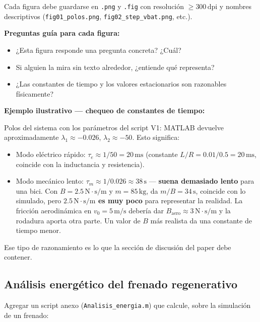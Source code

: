 \documentclass[11pt,a4paper]{article}
\newcommand{\unit}[1]{\,\mathrm{#1}}
\begin{document}
Cada figura debe guardarse en \texttt{.png} y \texttt{.fig} con resolución $\geq 300\unit{dpi}$ y nombres descriptivos (\texttt{fig01\_polos.png}, \texttt{fig02\_step\_vbat.png}, etc.).

\begin{guia}
\textbf{Preguntas guía para cada figura:}
\begin{itemize}
    \item ¿Esta figura responde una pregunta concreta? ¿Cuál?
    \item Si alguien la mira sin texto alrededor, ¿entiende qué representa?
    \item ¿Las constantes de tiempo y los valores estacionarios son razonables físicamente?
\end{itemize}
\end{guia}

\begin{ejemplo}
\textbf{Ejemplo ilustrativo --- chequeo de constantes de tiempo:}

Polos del sistema con los parámetros del script V1: MATLAB devuelve aproximadamente $\lambda_1 \approx -0.026$, $\lambda_2 \approx -50$. Esto significa:

\begin{itemize}
    \item Modo eléctrico rápido: $\tau_e \approx 1/50 = 20\unit{ms}$ (constante $L/R = 0.01/0.5 = 20\unit{ms}$, coincide con la inductancia y resistencia).
    \item Modo mecánico lento: $\tau_m \approx 1/0.026 \approx 38\unit{s}$ --- \textbf{suena demasiado lento} para una bici. Con $B = 2.5\unit{N\cdot s/m}$ y $m = 85\unit{kg}$, da $m/B = 34\unit{s}$, coincide con lo simulado, pero \textbf{$2.5\unit{N\cdot s/m}$ es muy poco} para representar la realidad. La fricción aerodinámica en $v_0 = 5\unit{m/s}$ debería dar $B_{\text{aero}} \approx 3\unit{N\cdot s/m}$ y la rodadura aporta otra parte. Un valor de $B$ más realista da una constante de tiempo menor.
\end{itemize}

Ese tipo de razonamiento es lo que la sección de discusión del paper debe contener.
\end{ejemplo}

\subsection{Análisis energético del frenado regenerativo}

Agregar un script anexo (\texttt{Analisis\_energia.m}) que calcule, sobre la simulación de un frenado:
\end{document}
